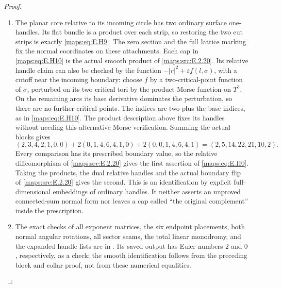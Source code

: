 \begin{proof}
\begin{enumerate}[label=\arabic*.,leftmargin=*]
\item The planar core relative to its incoming circle has two
ordinary surface one-handles.  Its flat bundle is a product
over each strip, so restoring the two cut strips is exactly
\eqref{maps:eq:E.H9}.  The zero section and the full lattice marking fix
the normal coordinates on these attachments.  Each cap in
\eqref{maps:eq:E.H10} is the actual smooth product of \ref{maps:src:E.2.20}.  Its relative
handle claim can also be checked by the function
$-|r|^2+\varepsilon f(l,\sigma)$, with a cutoff near the
incoming boundary: choose $f$ by a two-critical-point
function of $\sigma$, perturbed on its two critical tori
by the product Morse function on $T^3$.  On the remaining
arcs its base derivative dominates the perturbation, so
there are no further critical points.  The indices are
two plus the base indices, as in \eqref{maps:eq:E.H10}.  The product
description above fixes its handles without needing this
alternative Morse verification.  Summing the actual blocks
gives
\[
 (2,3,4,2,1,0,0)+2(0,1,4,6,4,1,0)
                     +2(0,0,1,4,6,4,1)
       =(2,5,14,22,21,10,2).
\]
Every comparison has its prescribed boundary value, so the
relative diffeomorphism of \ref{maps:src:E.2.20} gives the first assertion
of \eqref{maps:eq:E.H0}.  Taking the products, the dual relative handles
and the actual boundary flip of \ref{maps:src:E.2.20} gives the second.
This is an identification by explicit full-dimensional
embeddings of ordinary handles.  It neither asserts an
unproved connected-sum normal form nor leaves a cap called
``the original complement'' inside the prescription.

\item The exact checks of all exponent matrices, the six endpoint
placements, both normal angular rotations, all sector seams,
the total linear monodromy, and the expanded handle lists
are in .  Its saved output
has Euler numbers $2$ and $0$, respectively, as a check;
the smooth identification follows from the preceding block
and collar proof, not from these numerical equalities.


\end{enumerate}
\end{proof}
